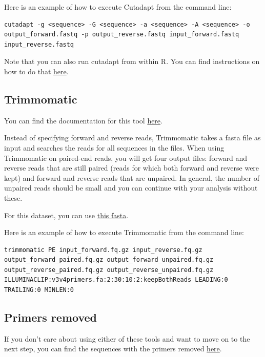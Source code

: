 \documentclass[
]{book}
\begin{document}
Here is an example of how to execute Cutadapt from the command line:

\begin{verbatim}
cutadapt -g <sequence> -G <sequence> -a <sequence> -A <sequence> -o output_forward.fastq -p output_reverse.fastq input_forward.fastq input_reverse.fastq
\end{verbatim}

Note that you can also run cutadapt from within R. You can find instructions on how to do that \href{https://benjjneb.github.io/dada2/ITS_workflow.html}{here}.

\hypertarget{trimmomatic}{%
\subsection{Trimmomatic}\label{trimmomatic}}

You can find the documentation for this tool \href{http://www.usadellab.org/cms/?page=trimmomatic}{here}.

Instead of specifying forward and reverse reads, Trimmomatic takes a fasta file as input and searches the reads for all sequences in the files. When using Trimmomatic on paired-end reads, you will get four output files: forward and reverse reads that are still paired (reads for which both forward and reverse were kept) and forward and reverse reads that are unpaired. In general, the number of unpaired reads should be small and you can continue with your analysis without these.

For this dataset, you can use \href{https://www.dropbox.com/s/wc2kihxfep23ycw/v3v4primers.fa?dl=0}{this fasta}.

Here is an example of how to execute Trimmomatic from the command line:

\begin{verbatim}
trimmomatic PE input_forward.fq.gz input_reverse.fq.gz output_forward_paired.fq.gz output_forward_unpaired.fq.gz output_reverse_paired.fq.gz output_reverse_unpaired.fq.gz ILLUMINACLIP:v3v4primers.fa:2:30:10:2:keepBothReads LEADING:0 TRAILING:0 MINLEN:0
\end{verbatim}

\hypertarget{primers-removed}{%
\subsection{Primers removed}\label{primers-removed}}

If you don't care about using either of these tools and want to move on to the next step, you can find the sequences with the primers removed \href{https://www.dropbox.com/s/qrf24anx9zllp9t/trimmed_data.zip?dl=0}{here}.
\end{document}
